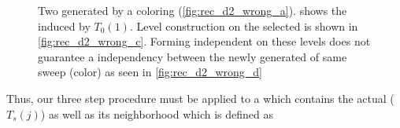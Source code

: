      \begin{figure}[thbp]
     	\centering
     	\hspace{0.6em}
     	\hspace{0.6em}
     	\hspace{0.6em}
     	\caption{Two \levelGroups generated by a \DTWO coloring (\cref{fig:rec_d2_wrong_a}).  shows the \subgraph induced by \levelGroup $T_0(1)$. Level construction on the selected \subgraph is shown in \cref{fig:rec_d2_wrong_c}. Forming \DTWO independent \levelGroups on these levels does not guarantee a \DTWO independency between the newly generated \levelGroups of same sweep (color) as seen in \cref{fig:rec_d2_wrong_d}}
     	\label{fig:rec_d2_wrong}
     \end{figure}
Thus, our three step procedure must be applied to a \subgraph which contains the actual \levelGroup ($T_s(j)$) as well as its \DKM neighborhood which is defined as 

